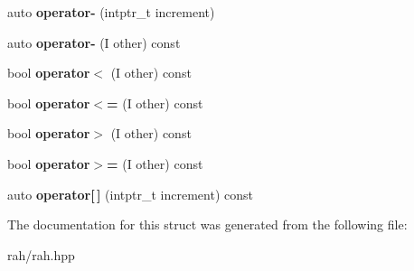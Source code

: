 \begin{DoxyCompactItemize}
auto {\bfseries operator-\/} (intptr\+\_\+t increment)
\item 
\mbox{\label{struct_r_a_h___n_a_m_e_s_p_a_c_e_1_1iterator__facade_3_01_i_00_01_r_00_01std_1_1random__access__iterator__tag_01_4_a42aa0c20016f701bd29fdcd043f45453}} 
auto {\bfseries operator-\/} (I other) const
\item 
\mbox{\label{struct_r_a_h___n_a_m_e_s_p_a_c_e_1_1iterator__facade_3_01_i_00_01_r_00_01std_1_1random__access__iterator__tag_01_4_a923112d4c6c8830b815c58084ac2df41}} 
bool {\bfseries operator$<$} (I other) const
\item 
\mbox{\label{struct_r_a_h___n_a_m_e_s_p_a_c_e_1_1iterator__facade_3_01_i_00_01_r_00_01std_1_1random__access__iterator__tag_01_4_aac5d04677e6ca5647960f65f6cbff22d}} 
bool {\bfseries operator$<$=} (I other) const
\item 
\mbox{\label{struct_r_a_h___n_a_m_e_s_p_a_c_e_1_1iterator__facade_3_01_i_00_01_r_00_01std_1_1random__access__iterator__tag_01_4_a9fa2c870804296896c00b3d61bad3066}} 
bool {\bfseries operator$>$} (I other) const
\item 
\mbox{\label{struct_r_a_h___n_a_m_e_s_p_a_c_e_1_1iterator__facade_3_01_i_00_01_r_00_01std_1_1random__access__iterator__tag_01_4_a84bbe6bcef3c643a745795d3d3256af8}} 
bool {\bfseries operator$>$=} (I other) const
\item 
\mbox{\label{struct_r_a_h___n_a_m_e_s_p_a_c_e_1_1iterator__facade_3_01_i_00_01_r_00_01std_1_1random__access__iterator__tag_01_4_ad9193e784c98537649a826dafd1f779f}} 
auto {\bfseries operator\mbox{[}$\,$\mbox{]}} (intptr\+\_\+t increment) const
\end{DoxyCompactItemize}


The documentation for this struct was generated from the following file\+:\begin{DoxyCompactItemize}
\item 
rah/rah.\+hpp\end{DoxyCompactItemize}
